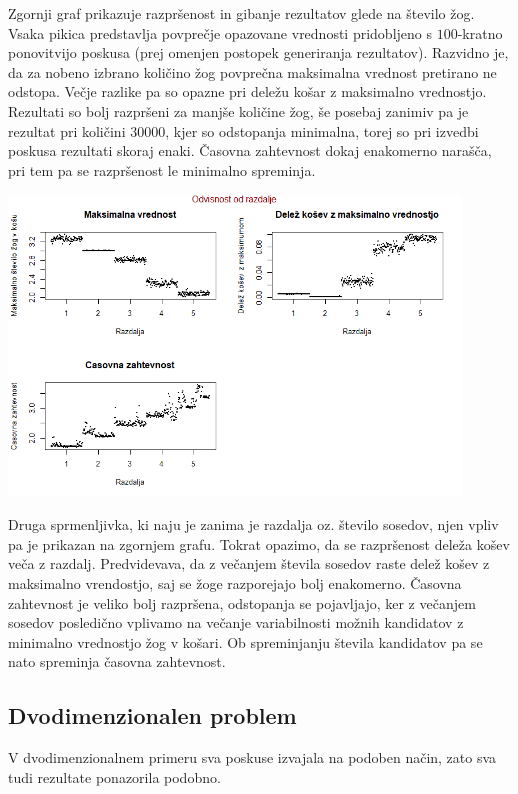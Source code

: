 \documentclass[a4paper, 11pt]{article}
\begin{document}
Zgornji graf prikazuje razpršenost in gibanje rezultatov glede na število žog. Vsaka pikica predstavlja povprečje opazovane vrednosti pridobljeno s $100$-kratno ponovitvijo poskusa (prej omenjen postopek generiranja rezultatov).
Razvidno je, da za nobeno izbrano količino žog povprečna maksimalna vrednost pretirano ne odstopa. Večje razlike pa so opazne pri deležu košar z maksimalno vrednostjo. Rezultati so bolj razpršeni za manjše količine žog, še posebaj zanimiv pa je rezultat
pri količini 30000, kjer so odstopanja minimalna, torej so pri izvedbi poskusa rezultati skoraj enaki.
Časovna zahtevnost dokaj enakomerno narašča, pri tem pa se razpršenost le minimalno spreminja.
 


\includegraphics[width=12cm, height= 8cm]{dim1_glede_na_razdaljo1.png}

Druga sprmenljivka, ki naju je zanima je razdalja oz. število sosedov, njen vpliv pa je prikazan na zgornjem grafu.
Tokrat opazimo, da se razpršenost deleža košev veča z razdalj. Predvidevava, da z večanjem števila sosedov raste delež košev z maksimalno vrendostjo, saj se žoge razporejajo bolj enakomerno.
Časovna zahtevnost je veliko bolj razpršena, odstopanja se pojavljajo, ker z večanjem sosedov posledično vplivamo na večanje variabilnosti možnih kandidatov z minimalno vrednostjo žog v košari. Ob spreminjanju števila kandidatov pa se nato spreminja časovna zahtevnost.
\bigbreak

\subsection{Dvodimenzionalen problem}
V dvodimenzionalnem primeru sva poskuse izvajala na podoben način, zato sva tudi rezultate ponazorila podobno.
\end{document}
